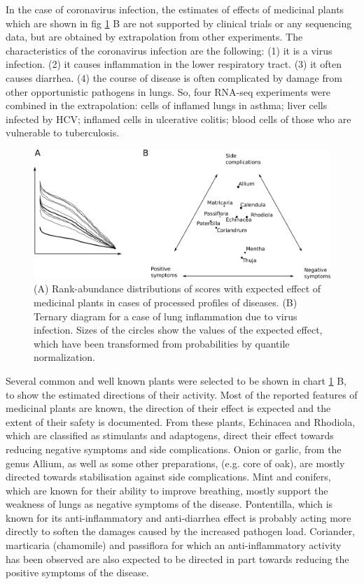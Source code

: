 \documentclass[12pt,aps]{revtex4}
\begin{document}
In the case of coronavirus infection, the estimates of effects of
medicinal plants which are shown in fig \ref{fig_herbal_positive} B are not supported by clinical
trials or any sequencing data, but are obtained by extrapolation from
other experiments. The characteristics of the coronavirus infection
are the following: (1) it is a virus infection. (2) it causes
inflammation in the lower respiratory tract. (3) it often causes
diarrhea. (4) the course of disease is often complicated by damage
from other opportunistic pathogens in lungs. So, four RNA-seq
experiments were combined in the extrapolation: cells of inflamed
lungs in asthma; liver cells infected by HCV; inflamed cells in
ulcerative colitis; blood cells of those who are vulnerable to
tuberculosis.



\begin{figure}[h]
\centerline{\includegraphics[width=0.95\columnwidth]{fig_herbal_positive.png}}
\caption{
(A) Rank-abundance distributions of scores with expected effect of
medicinal plants in cases of processed profiles of diseases. (B)
Ternary diagram for a case of lung inflammation due to virus
infection. Sizes of the circles show the values of the expected
effect, which have been transformed from probabilities by quantile
normalization.}
\label{fig_herbal_positive}
\end{figure}

Several common and well known plants were selected to be shown in
chart  \ref{fig_herbal_positive} B, to show the estimated directions of their activity.  Most of the reported features of medicinal plants are
known, the direction of their effect is expected and the extent of
their safety is documented. From these plants, Echinacea and Rhodiola,
which are classified as stimulants and adaptogens, direct their effect
towards reducing negative symptoms and side complications. Onion or
garlic, from the genus Allium, as well as some other preparations,
(e.g. core of oak), are mostly directed towards stabilisation against
side complications. Mint and conifers, which are known for their
ability to improve breathing, mostly support the weakness of lungs as
negative symptoms of the disease. Pontentilla, which is known for its
anti-inflammatory and anti-diarrhea effect is probably acting more
directly to soften the damages caused by the increased pathogen load. Coriander,
marticaria (chamomile) and passiflora for which an anti-inflammatory
activity has been observed are also expected to be directed in part
towards reducing the positive symptoms of the disease.
\end{document}

